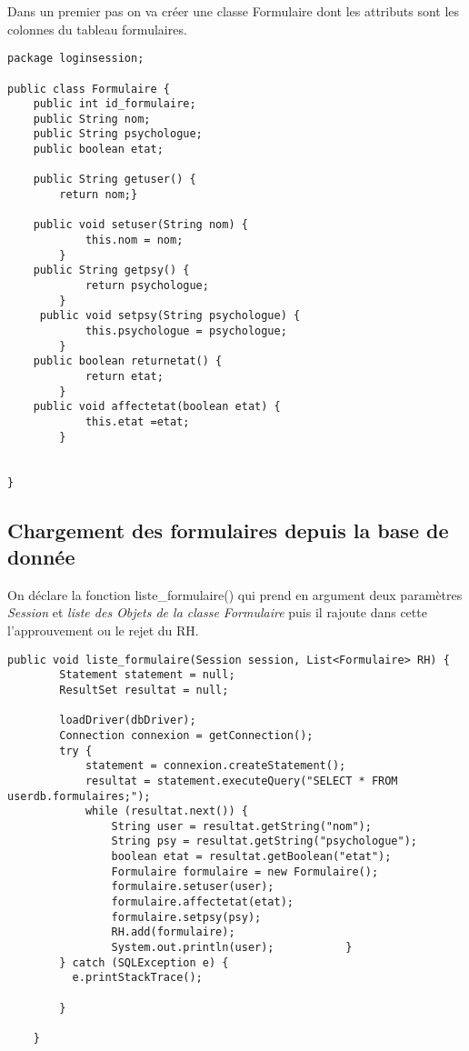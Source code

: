 \documentclass[12]{article}
\begin{document}
Dans un premier pas on va créer une classe Formulaire dont les attributs sont les colonnes du tableau formulaires.

\lstset{language=java}
\begin{lstlisting}
package loginsession;

public class Formulaire {
	public int id_formulaire;
	public String nom;
	public String psychologue;
	public boolean etat;
	
	public String getuser() {
		return nom;}
		
	public void setuser(String nom) {
	        this.nom = nom;
	    }
	public String getpsy() {
	        return psychologue;
	    }
	 public void setpsy(String psychologue) {
	        this.psychologue = psychologue;
	    }
    public boolean returnetat() {
			return etat;
		}
    public void affectetat(boolean etat) {
			this.etat =etat;
		}
		

}
\end{lstlisting}
\subsection{Chargement des formulaires depuis la base de donnée}

On déclare la fonction liste\_formulaire() qui prend en argument deux paramètres \textit{Session} et \textit{liste des Objets de la classe Formulaire} puis il rajoute dans cette l'approuvement ou le rejet du RH.

\lstset{language=java}
\begin{lstlisting}
public void liste_formulaire(Session session, List<Formulaire> RH) {
        Statement statement = null;
        ResultSet resultat = null;

        loadDriver(dbDriver);
        Connection connexion = getConnection();
        try {
            statement = connexion.createStatement();
            resultat = statement.executeQuery("SELECT * FROM userdb.formulaires;");
            while (resultat.next()) {
                String user = resultat.getString("nom");
                String psy = resultat.getString("psychologue");
                boolean etat = resultat.getBoolean("etat");
                Formulaire formulaire = new Formulaire();
                formulaire.setuser(user);
                formulaire.affectetat(etat);
                formulaire.setpsy(psy);
                RH.add(formulaire);
                System.out.println(user);           }
        } catch (SQLException e) {
          e.printStackTrace();
            
        }
       
    }
\end{lstlisting}
\end{document}
